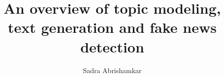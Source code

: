 \documentclass[a4paper,12pt,twoside]{report}
\begin{document}
\title{\LARGE {\bf An overview of topic modeling, text generation and fake news detection}\\
 \vspace*{6mm}
}

\author{Sadra Abrishamkar}
\submitdate{\today}

\normallinespacing
\maketitle

\preface
% 

% 
% 


\body







% 




% 

% 

\end{document}

